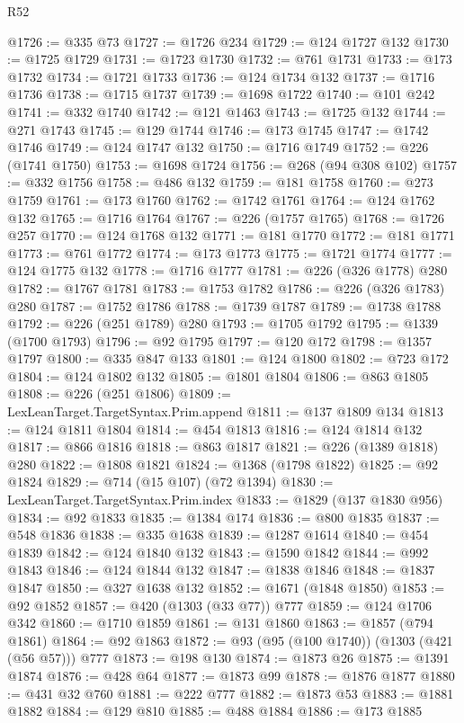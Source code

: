 \begin{lexlean}{R52}
\begin{coremodule}
@1726 := @335 @73
@1727 := @1726 @234
@1729 := @124 @1727 @132
@1730 := @1725 @1729
@1731 := @1723 @1730
@1732 := @761 @1731
@1733 := @173 @1732
@1734 := @1721 @1733
@1736 := @124 @1734 @132
@1737 := @1716 @1736
@1738 := @1715 @1737
@1739 := @1698 @1722
@1740 := @101 @242
@1741 := @332 @1740
@1742 := @121 @1463
@1743 := @1725 @132
@1744 := @271 @1743
@1745 := @129 @1744
@1746 := @173 @1745
@1747 := @1742 @1746
@1749 := @124 @1747 @132
@1750 := @1716 @1749
@1752 := @226 (@1741 @1750)
@1753 := @1698 @1724
@1756 := @268 (@94 @308 @102)
@1757 := @332 @1756
@1758 := @486 @132
@1759 := @181 @1758
@1760 := @273 @1759
@1761 := @173 @1760
@1762 := @1742 @1761
@1764 := @124 @1762 @132
@1765 := @1716 @1764
@1767 := @226 (@1757 @1765)
@1768 := @1726 @257
@1770 := @124 @1768 @132
@1771 := @181 @1770
@1772 := @181 @1771
@1773 := @761 @1772
@1774 := @173 @1773
@1775 := @1721 @1774
@1777 := @124 @1775 @132
@1778 := @1716 @1777
@1781 := @226 (@326 @1778) @280
@1782 := @1767 @1781
@1783 := @1753 @1782
@1786 := @226 (@326 @1783) @280
@1787 := @1752 @1786
@1788 := @1739 @1787
@1789 := @1738 @1788
@1792 := @226 (@251 @1789) @280
@1793 := @1705 @1792
@1795 := @1339 (@1700 @1793)
@1796 := @92 @1795
@1797 := @120 @172
@1798 := @1357 @1797
@1800 := @335 @847 @133
@1801 := @124 @1800
@1802 := @723 @172
@1804 := @124 @1802 @132
@1805 := @1801 @1804
@1806 := @863 @1805
@1808 := @226 (@251 @1806)
@1809 := LexLeanTarget.TargetSyntax.Prim.append
@1811 := @137 @1809 @134
@1813 := @124 @1811 @1804
@1814 := @454 @1813
@1816 := @124 @1814 @132
@1817 := @866 @1816
@1818 := @863 @1817
@1821 := @226 (@1389 @1818) @280
@1822 := @1808 @1821
@1824 := @1368 (@1798 @1822)
@1825 := @92 @1824
@1829 := @714 (@15 @107) (@72 @1394)
@1830 := LexLeanTarget.TargetSyntax.Prim.index
@1833 := @1829 (@137 @1830 @956)
@1834 := @92 @1833
@1835 := @1384 @174
@1836 := @800 @1835
@1837 := @548 @1836
@1838 := @335 @1638
@1839 := @1287 @1614
@1840 := @454 @1839
@1842 := @124 @1840 @132
@1843 := @1590 @1842
@1844 := @992 @1843
@1846 := @124 @1844 @132
@1847 := @1838 @1846
@1848 := @1837 @1847
@1850 := @327 @1638 @132
@1852 := @1671 (@1848 @1850)
@1853 := @92 @1852
@1857 := @420 (@1303 (@33 @77)) @777
@1859 := @124 @1706 @342
@1860 := @1710 @1859
@1861 := @131 @1860
@1863 := @1857 (@794 @1861)
@1864 := @92 @1863
@1872 := @93 (@95 (@100 @1740)) (@1303 (@421 (@56 @57))) @777
@1873 := @198 @130
@1874 := @1873 @26
@1875 := @1391 @1874
@1876 := @428 @64
@1877 := @1873 @99
@1878 := @1876 @1877
@1880 := @431 @32 @760
@1881 := @222 @777
@1882 := @1873 @53
@1883 := @1881 @1882
@1884 := @129 @810
@1885 := @488 @1884
@1886 := @173 @1885

\end{coremodule}
\end{lexlean}
